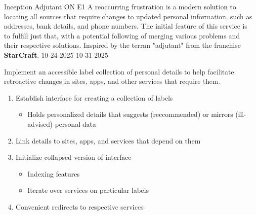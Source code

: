 \documentclass[7px]{article}
\begin{document}
\frontmatter
{Inception}
{Adjutant}
{ON}
{E1}
{A reoccurring frustration is a modern solution to locating all sources that require changes to updated personal information, such as addresses, bank details, and phone numbers. The initial feature of this service is to fulfill just that, with a potential following of merging various problems and their respective solutions. Inspired by the terran "adjutant" from the franchise \textbf{StarCraft}.}
{10-24-2025}
{10-31-2025}

\strategy
{Implement an accessible label collection of personal details to help facilitate retroactive changes in sites, apps, and other services that require them.}
{
  \begin{enumerate}
    \item Establish interface for creating a collection of labels
      \begin{itemize}[label=$\multimapdotinv$, leftmargin=3mm]
        \item Holds personalized details that suggests (reccommended) or mirrors (ill-advised) personal data
      \end{itemize}
    \item Link details to sites, apps, and services that depend on them
    \item Initialize collapsed version of interface
      \begin{itemize}[label=$\multimapdotinv$, leftmargin=3mm]
        \item Indexing features
        \item Iterate over services on particular labels
      \end{itemize}
    \item Convenient redirects to respective services
    \end{enumerate}
}
\end{document}
